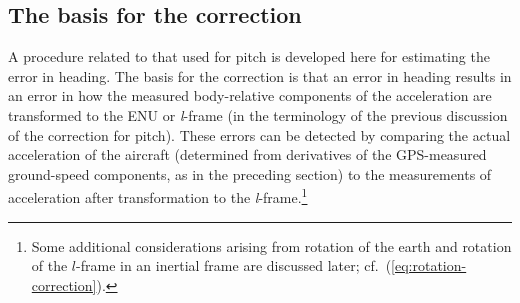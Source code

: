 \documentclass[english,british,amt,bookmarks=false,unicode=true]{copernicus}\usepackage[]{graphicx}\usepackage[]{color}
\begin{document}
\subsection{The basis for the correction}

A procedure related to that used for pitch is developed here for estimating
the error in heading. The basis for the correction is that an error
in heading results in an error in how the measured body-relative components
of the acceleration are transformed to the ENU or \emph{l}-frame (in
the terminology of the previous discussion of the correction for pitch).
These errors can be detected by comparing the actual acceleration
of the aircraft (determined from derivatives of the GPS-measured ground-speed
components, as in the preceding section) to the measurements of acceleration
after transformation to the \emph{l}-frame.\footnote{Some additional considerations arising from rotation of the earth
and rotation of the $l$-frame in an inertial frame are discussed
later; cf.~(\ref{eq:rotation-correction}).} 
\end{document}
